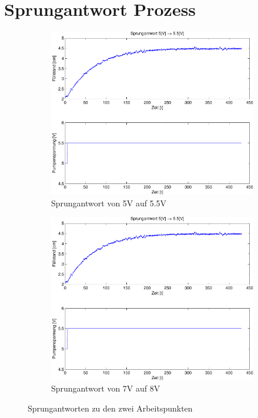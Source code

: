\section{Sprungantwort Prozess}

\begin{figure}[h!]
	\centering
	\begin{subfigure}{0.475\textwidth}
		\includegraphics[width=1\textwidth]{06/step_5_55_plot.pdf}
		\caption{Sprungantwort von 5V auf 5.5V}
	\end{subfigure}
	\hfill{}
	\begin{subfigure}{0.475\textwidth}
		\includegraphics[width=1\textwidth]{06/step_5_55_plot.pdf}
		\caption{Sprungantwort von 7V auf 8V}
	\end{subfigure}
	\caption{Sprungantworten zu den zwei Arbeitspunkten}
\end{figure}
